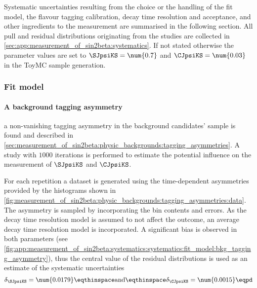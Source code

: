 Systematic uncertainties resulting from the choice or the handling of the fit
model, the flavour tagging calibration, decay time resolution and acceptance,
and other ingredients to the measurement are summarised in the following
section. All pull and residual distributions originating from the studies are
collected in \cref{sec:app:measurement_of_sin2beta:systematics}. If not stated
otherwise the \CP parameter values are set to $\SJpsiKS = \num{0.7}$ and
$\CJpsiKS = \num{0.03}$ in the \acf{ToyMC} sample generation.

\subsubsection{Fit model}
\label{sec:measurement_of_sin2beta:systematics:systematics:fit_model}

\paragraph{A background tagging asymmetry} \ie a non-vanishing tagging
asymmetry in the background candidates' sample is found and described in
\cref{sec:measurement_of_sin2beta:physic_backgrounds:tagging_asymmetries}. A
\ToyMC study with $\num{1000}$ iterations is performed to estimate the potential
influence on the measurement of $\SJpsiKS$ and $\CJpsiKS$. 

For each repetition a dataset is generated using the time-dependent asymmetries
provided by the histograms shown in
\cref{fig:measurement_of_sin2beta:physic_backgrounds:tagging_asymmetries:data}.
The asymmetry is sampled by incorporating the bin contents and errors. As the
decay time resolution model is assumed to not affect the outcome, an average
decay time resolution model is incorporated. A significant bias is observed in
both \CP parameters (see 
\cref{fig:app:measurement_of_sin2beta:systematics:systematics:fit_model:bkg_tagging_asymmetry}), 
thus the central value of the residual distributions is used as an estimate of
the systematic uncertainties
%
\begin{equation}
  \delta_{\SJpsiKS} = \num{0.0179}\eqthinspace\text{and}\eqthinspace\delta_{\CJpsiKS} = \num{0.0015}\eqpd
\end{equation}

